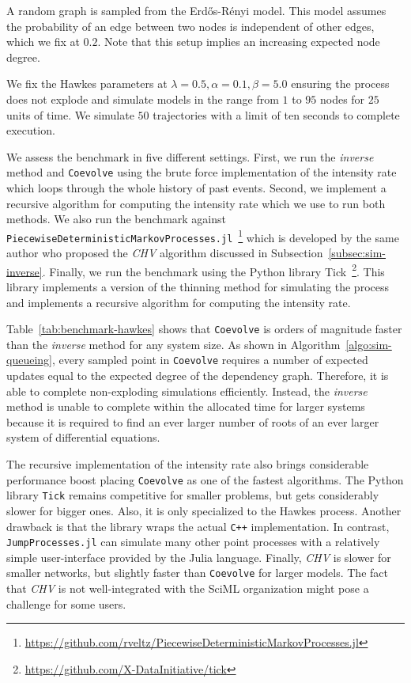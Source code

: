 \documentclass{juliacon}
\begin{document}
A random graph is sampled from the Erd\H{o}s-Rényi model. This model assumes the probability of an edge between two nodes is independent of other edges, which we fix at \( 0.2 \). Note that this setup implies an increasing expected node degree. 

We fix the Hawkes parameters at \( \lambda = 0.5 , \alpha = 0.1 , \beta = 5.0 \) ensuring the process does not explode and simulate models in the range from \( 1 \) to \( 95 \) nodes for \( 25 \) units of time. We simulate \( 50 \) trajectories with a limit of ten seconds to complete execution. 

We assess the benchmark in five different settings. First, we run the \textit{inverse} method and \texttt{Coevolve} using the brute force implementation of the intensity rate which loops through the whole history of past events. Second, we implement a recursive algorithm for computing the intensity rate which we use to run both methods. We also run the benchmark against \texttt{PiecewiseDeterministicMarkovProcesses.jl}~\footnote{\url{https://github.com/rveltz/PiecewiseDeterministicMarkovProcesses.jl}} which is developed by the same author who proposed the \textit{CHV} algorithm discussed in Subsection~\ref{subsec:sim-inverse}. Finally, we run the benchmark using the Python library Tick~\footnote{\url{https://github.com/X-DataInitiative/tick}}. This library implements a version of the thinning method for simulating the process and implements a recursive algorithm for computing the intensity rate. 

Table~\ref{tab:benchmark-hawkes} shows that \texttt{Coevolve} is orders of magnitude faster than the \textit{inverse} method for any system size. As shown in Algorithm~\ref{algo:sim-queueing}, every sampled point in \texttt{Coevolve} requires a number of expected updates equal to the expected degree of the dependency graph. Therefore, it is able to complete non-exploding simulations efficiently. Instead, the \textit{inverse} method is unable to complete within the allocated time for larger systems because it is required to find an ever larger number of roots of an ever larger system of differential equations. 

The recursive implementation of the intensity rate also brings considerable performance boost placing \texttt{Coevolve} as one of the fastest algorithms. The Python library \texttt{Tick} remains competitive for smaller problems, but gets considerably slower for bigger ones. Also, it is only specialized to the Hawkes process. Another drawback is that the library wraps the actual \texttt{C++} implementation. In contrast, \texttt{JumpProcesses.jl} can simulate many other point processes with a relatively simple user-interface provided by the Julia language. Finally, \textit{CHV} is slower for smaller networks, but slightly faster than \texttt{Coevolve} for larger models. The fact that \textit{CHV} is not well-integrated with the SciML organization might pose a challenge for some users.
\end{document}
